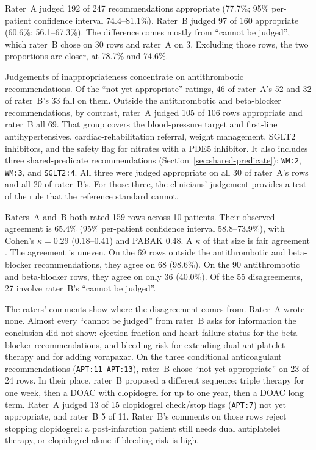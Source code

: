 Rater~A judged 192 of 247 recommendations appropriate (77.7\%; 95\% per-patient confidence
interval 74.4--81.1\%). Rater~B judged 97 of 160 appropriate (60.6\%; 56.1--67.3\%). The
difference comes mostly from ``cannot be judged'', which rater~B chose on 30 rows and
rater~A on 3. Excluding those rows, the two proportions are closer, at 78.7\% and 74.6\%.

Judgements of inappropriateness concentrate on antithrombotic recommendations. Of the
``not yet appropriate'' ratings, 46 of rater~A's 52 and 32 of rater~B's 33 fall on them.
Outside the antithrombotic and beta-blocker recommendations, by contrast, rater~A judged 105
of 106 rows appropriate and rater~B all 69. That group covers the blood-pressure target and
first-line antihypertensives, cardiac-rehabilitation referral, weight management, SGLT2
inhibitors, and the safety flag for nitrates with a PDE5 inhibitor. It also includes three
shared-predicate recommendations (Section~\ref{sec:shared-predicate}): \texttt{WM:2},
\texttt{WM:3}, and \texttt{SGLT2:4}. All three were judged appropriate on all 30 of rater~A's
rows and all 20 of rater~B's. For those three, the clinicians' judgement provides a test of
the rule that the reference standard cannot.

Raters~A and~B both rated 159 rows across 10 patients. Their observed agreement is 65.4\%
(95\% per-patient confidence interval 58.8--73.9\%), with Cohen's $\kappa = 0.29$
(0.18--0.41) and PABAK 0.48. A $\kappa$ of that size is fair agreement \cite{landis1977}. The
agreement is uneven. On the 69 rows outside the antithrombotic and beta-blocker
recommendations, they agree on 68 (98.6\%). On the 90 antithrombotic and beta-blocker rows,
they agree on only 36 (40.0\%). Of the 55 disagreements, 27 involve rater~B's ``cannot be
judged''.

The raters' comments show where the disagreement comes from. Rater~A wrote none. Almost every
``cannot be judged'' from rater~B asks for information the conclusion did not show: ejection
fraction and heart-failure status for the beta-blocker recommendations, and bleeding risk for
extending dual antiplatelet therapy and for adding vorapaxar. On the three conditional
anticoagulant recommendations (\texttt{APT:11}--\texttt{APT:13}), rater~B chose ``not yet
appropriate'' on 23 of 24 rows. In their place, rater~B proposed a different sequence: triple therapy for one
week, then a DOAC with clopidogrel for up to one year, then a DOAC long term. Rater~A judged 13
of 15 clopidogrel check/stop flags (\texttt{APT:7}) not yet appropriate, and rater~B 5 of 11.
Rater~B's comments on those rows reject stopping clopidogrel: a post-infarction patient still
needs dual antiplatelet therapy, or clopidogrel alone if bleeding risk is high.

